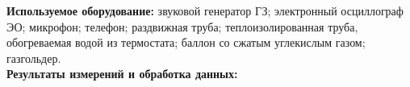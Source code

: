 \documentclass[a4paper, 12pt]{article}%
\begin{document}
	\begin{figure}[h]
\end{figure}
	
	
\textbf{Используемое оборудование:} 
звуковой генератор ГЗ; электронный осциллограф ЭО; микрофон; телефон; раздвижная труба; теплоизолированная труба, обогреваемая водой из термостата; баллон со сжатым углекислым газом; газгольдер.
	\\
	
\textbf{Результаты измерений и обработка данных: }	
\end{document}
